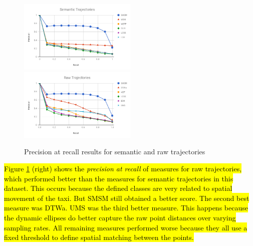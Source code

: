 \documentclass[12pt]{article}
\begin{document}
\begin{figure}[ht!]
\centering
\centerline{
\includegraphics[width=0.5\textwidth]{Images/new_P_R-chart_San_Francisco.png}
\includegraphics[width=0.5\textwidth]{Images/new_P_R-chart_San_Francisco-raw.png}
}
\caption{ Precision at recall results for semantic and raw trajectories}
\label{fig:new_sanfrancisco_precision_recall}
\end{figure}



\hl{Figure {\ref{fig:new_sanfrancisco_precision_recall}} (right) shows the \emph{precision at recall} of measures for raw trajectories, which performed better than the measures for semantic trajectories in this dataset. This occurs because the defined classes are very related to spatial movement of the taxi. But SMSM still obtained a better score. The second best measure was DTWa. UMS was the third better measure. This happens because the dynamic ellipses do better capture the raw point distances over varying sampling rates.
All remaining measures performed worse because they all use a fixed threshold to define spatial matching between the points.}
\end{document}

